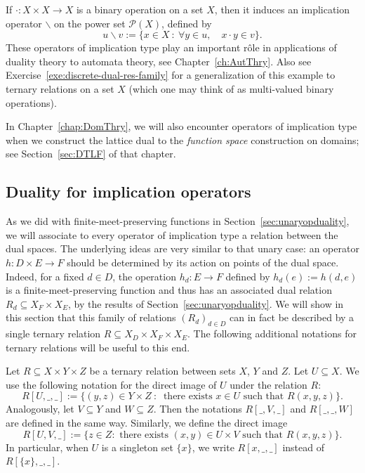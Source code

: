 \begin{example}\label{exa:residualfromdot} If $\cdot \colon X \times X \to X$ is
a binary operation on a set $X$, then it induces an implication operator
$\backslash$ on the power set $\mathcal{P}(X)$, defined by \[ u \backslash v :=
\{x \in X \ \colon \ \forall y \in u, \quad x \cdot y \in v\}.\] These operators
of implication type play an important rôle in applications of duality theory to
automata theory, see Chapter~\ref{ch:AutThry}. Also see
Exercise~\ref{exe:discrete-dual-res-family} for a generalization of this example
to ternary relations on a set $X$ (which one may think of as multi-valued binary
operations).  
\end{example}

In Chapter~\ref{chap:DomThry}, we will also encounter operators of implication type when we construct the lattice dual to the \emph{function space} construction on domains; see %
Section~\ref{sec:DTLF} of that chapter.

\subsection*{Duality for implication operators}
As we did with finite-meet-preserving functions in
Section~\ref{sec:unaryopduality}, we will associate to every operator of
implication type a relation between the dual spaces. The underlying ideas are
very similar to that unary case: an operator $h \colon D \times E \to F$ should
be determined by its action on points of the dual space. Indeed, for a fixed $d
\in D$, the operation $h_d \colon E \to F$ defined by $h_d(e) := h(d,e)$ is a
finite-meet-preserving function and thus has an associated dual relation $R_d
\subseteq X_F \times X_E$, by the results of Section~\ref{sec:unaryopduality}.
We will show in this section that this family of relations $(R_d)_{d \in D}$ can
in fact be described by a single ternary relation $R \subseteq X_D \times X_F
\times X_E$. The following additional notations for ternary relations will be useful to this end.

\begin{notation}\label{ternary-relation-notation} Let $R \subseteq X \times Y
\times Z$ be a ternary relation between sets $X$, $Y$ and $Z$. Let $U \subseteq
X$. We use the following notation for the direct image of $U$ under the relation
$R$: \[ R[U,\_,\_] := \{(y,z) \in Y \times Z \ \colon \ \text{ there exists } x
\in U \text{ such that } R(x,y,z)\}.\] Analogously, let $V \subseteq Y$ and $W
\subseteq Z$. Then the notations $R[\_,V,\_]$ and $R[\_,\_,W]$ are defined in
the same way. Similarly, we define the direct image \[ R[U, V, \_] := \{z \in Z
\colon \text { there exists } (x,y) \in U \times V \text{ such that }
R(x,y,z)\}.\] In particular, when $U$ is a singleton set $\{x\}$, we write
$R[x,\_,\_]$ instead of $R[\{x\},\_,\_]$.  \end{notation}



